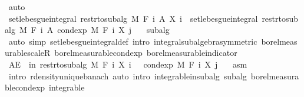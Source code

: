 \begin{isabellebody}
\ auto\isanewline
\ \ \ \ \isamarkupfalse%
\ \isamarkupfalse%
\ {\isachardoublequoteopen}set{\isacharunderscore}{\kern0pt}lebesgue{\isacharunderscore}{\kern0pt}integral\ {\isacharparenleft}{\kern0pt}restr{\isacharunderscore}{\kern0pt}to{\isacharunderscore}{\kern0pt}subalg\ M\ {\isacharparenleft}{\kern0pt}F\ i{\isacharparenright}{\kern0pt}{\isacharparenright}{\kern0pt}\ A\ {\isacharparenleft}{\kern0pt}X\ i{\isacharparenright}{\kern0pt}\ {\isacharequal}{\kern0pt}\ set{\isacharunderscore}{\kern0pt}lebesgue{\isacharunderscore}{\kern0pt}integral\ {\isacharparenleft}{\kern0pt}restr{\isacharunderscore}{\kern0pt}to{\isacharunderscore}{\kern0pt}subalg\ M\ {\isacharparenleft}{\kern0pt}F\ i{\isacharparenright}{\kern0pt}{\isacharparenright}{\kern0pt}\ A\ {\isacharparenleft}{\kern0pt}cond{\isacharunderscore}{\kern0pt}exp\ M\ {\isacharparenleft}{\kern0pt}F\ i{\isacharparenright}{\kern0pt}\ {\isacharparenleft}{\kern0pt}X\ j{\isacharparenright}{\kern0pt}{\isacharparenright}{\kern0pt}{\isachardoublequoteclose}\ \isamarkupfalse%
\ {\isacharasterisk}{\kern0pt}\ subalg\ \isamarkupfalse%
\ {\isacharparenleft}{\kern0pt}auto\ simp{\isacharcolon}{\kern0pt}\ set{\isacharunderscore}{\kern0pt}lebesgue{\isacharunderscore}{\kern0pt}integral{\isacharunderscore}{\kern0pt}def\ intro{\isacharbang}{\kern0pt}{\isacharcolon}{\kern0pt}\ integral{\isacharunderscore}{\kern0pt}subalgebra{}{\isacharbrackleft}{\kern0pt}symmetric{\isacharbrackright}{\kern0pt}\ borel{\isacharunderscore}{\kern0pt}measurable{\isacharunderscore}{\kern0pt}scaleR\ borel{\isacharunderscore}{\kern0pt}measurable{\isacharunderscore}{\kern0pt}cond{\isacharunderscore}{\kern0pt}exp\ borel{\isacharunderscore}{\kern0pt}measurable{\isacharunderscore}{\kern0pt}indicator{\isacharparenright}{\kern0pt}\isanewline
\ \ \isacommand{{\isacharbraceright}{\kern0pt}}\isamarkupfalse%
\isanewline
\ \ \isamarkupfalse%
\ {\isachardoublequoteopen}AE\ {\isasymxi}\ in\ restr{\isacharunderscore}{\kern0pt}to{\isacharunderscore}{\kern0pt}subalg\ M\ {\isacharparenleft}{\kern0pt}F\ i{\isacharparenright}{\kern0pt}{\isachardot}{\kern0pt}\ X\ i\ {\isasymxi}\ {\isacharequal}{\kern0pt}\ cond{\isacharunderscore}{\kern0pt}exp\ M\ {\isacharparenleft}{\kern0pt}F\ i{\isacharparenright}{\kern0pt}\ {\isacharparenleft}{\kern0pt}X\ j{\isacharparenright}{\kern0pt}\ {\isasymxi}{\isachardoublequoteclose}\ \isamarkupfalse%
\ asm\ \isamarkupfalse%
\ {\isacharparenleft}{\kern0pt}intro\ r{\isachardot}{\kern0pt}density{\isacharunderscore}{\kern0pt}unique{\isacharunderscore}{\kern0pt}banach{\isacharcomma}{\kern0pt}\ auto\ intro{\isacharcolon}{\kern0pt}\ integrable{\isacharunderscore}{\kern0pt}in{\isacharunderscore}{\kern0pt}subalg\ subalg\ borel{\isacharunderscore}{\kern0pt}measurable{\isacharunderscore}{\kern0pt}cond{\isacharunderscore}{\kern0pt}exp\ integrable{\isacharparenright}{\kern0pt}\isanewline

\end{isabellebody}
